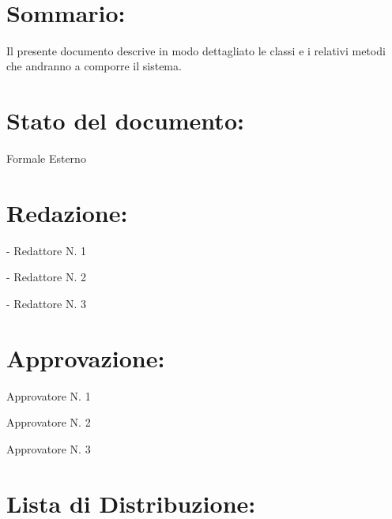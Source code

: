 \newpage

\begin{center} %
	\begin{Huge}	
				\textbf{\TITOLODOC}
			\\
	\end{Huge}
\end{center}

\section*{\Large Sommario:} %
\indent \indent
Il presente documento descrive in modo dettagliato le classi e i relativi metodi che andranno a comporre il sistema.

\section*{\Large Stato del documento:}
\indent \indent
	Formale Esterno

\section*{\Large Redazione:}
	\begin{elencopuntato}[\normindent]
		\item[-] Redattore N. 1
		\item[-] Redattore N. 2
		\item[-] Redattore N. 3
	\end{elencopuntato}

\section*{\Large Approvazione:}
	\begin{elencopuntato}[\normindent]
		\item Approvatore N. 1
		\item Approvatore N. 2
		\item Approvatore N. 3
	\end{elencopuntato}

\section*{\LARGE Lista di Distribuzione:}

